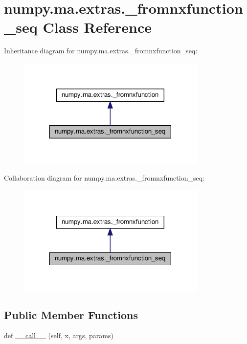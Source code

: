 \hypertarget{classnumpy_1_1ma_1_1extras_1_1__fromnxfunction__seq}{}\section{numpy.\+ma.\+extras.\+\_\+fromnxfunction\+\_\+seq Class Reference}
\label{classnumpy_1_1ma_1_1extras_1_1__fromnxfunction__seq}


Inheritance diagram for numpy.\+ma.\+extras.\+\_\+fromnxfunction\+\_\+seq\+:
\nopagebreak
\begin{figure}[H]
\begin{center}
\leavevmode
\includegraphics[width=266pt]{classnumpy_1_1ma_1_1extras_1_1__fromnxfunction__seq__inherit__graph}
\end{center}
\end{figure}


Collaboration diagram for numpy.\+ma.\+extras.\+\_\+fromnxfunction\+\_\+seq\+:
\nopagebreak
\begin{figure}[H]
\begin{center}
\leavevmode
\includegraphics[width=266pt]{classnumpy_1_1ma_1_1extras_1_1__fromnxfunction__seq__coll__graph}
\end{center}
\end{figure}
\subsection*{Public Member Functions}
\begin{DoxyCompactItemize}
\item 
def \hyperlink{classnumpy_1_1ma_1_1extras_1_1__fromnxfunction__seq_a2621ce425bdecc24caf01e119ec051f6}{\+\_\+\+\_\+call\+\_\+\+\_\+} (self, x, args, params)
\end{DoxyCompactItemize}


